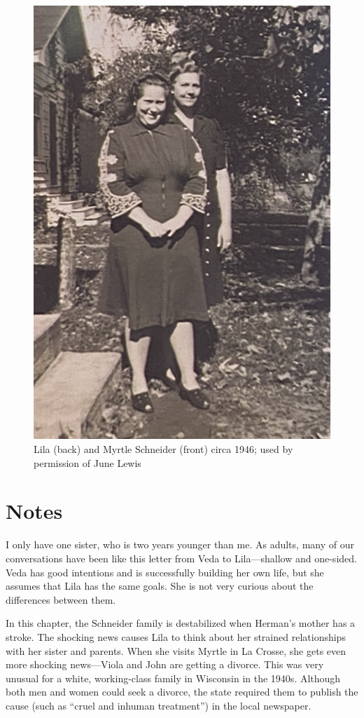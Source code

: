 \documentclass[
  letterpaper,
]{book}
\begin{document}
\begin{figure}[H]

{\centering \includegraphics[width=0.55\linewidth,height=\textheight,keepaspectratio]{images/Akou22.JPG}

}

\caption[Lila (back) and Myrtle Schneider (front) circa 1946]{Lila
(back) and Myrtle Schneider (front) circa 1946; used by permission of
June Lewis}

\end{figure}%

\section{Notes}\label{notes-41}

I only have one sister, who is two years younger than me. As adults,
many of our conversations have been like this letter from Veda to
Lila---shallow and one-sided. Veda has good intentions and is
successfully building her own life, but she assumes that Lila has the
same goals. She is not very curious about the differences between them.

In this chapter, the Schneider family is destabilized when Herman's
mother has a stroke. The shocking news causes Lila to think about her
strained relationships with her sister and parents. When she visits
Myrtle in La Crosse, she gets even more shocking news---Viola and John
are getting a divorce. This was very unusual for a white, working-class
family in Wisconsin in the 1940s. Although both men and women could seek
a divorce, the state required them to publish the cause (such as ``cruel
and inhuman treatment'') in the local newspaper.
\end{document}
